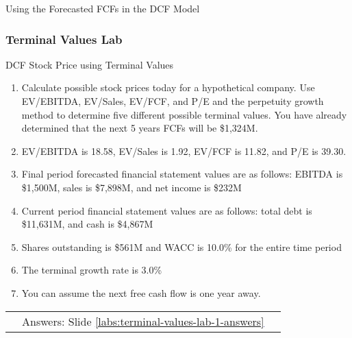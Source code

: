 \documentclass[handout, 11pt]{beamer}
\begin{document}
\begin{section}[Valuation]{Using the Forecasted FCFs in the DCF Model}
\begin{frame}
\end{frame}
\footnotesize
\begin{frame}
\frametitle{Terminal Values Lab}
{
\begin{block}{DCF Stock Price using Terminal Values}
\begin{enumerate}
\item Calculate possible stock prices today for a hypothetical company. Use EV/EBITDA, EV/Sales, EV/FCF, and P/E and the perpetuity growth method to determine five different possible terminal values. You have already determined that the next 5 years FCFs will be \$1,324M. 
\item EV/EBITDA is 18.58, EV/Sales is 1.92, EV/FCF is 11.82, and P/E is 39.30.
\item Final period forecasted financial statement values are as follows: EBITDA is \$1,500M, sales is \$7,898M, and net income is \$232M
\item Current period financial statement values are as follows: total debt is \$11,631M, and cash is \$4,867M
\item Shares outstanding is \$561M and WACC is 10.0\% for the entire time period
\item The terminal growth rate is 3.0\%
\item You can assume the next free cash flow is one year away.
\end{enumerate}
\vfill
\begin{tabular*}{\textwidth}{@{\extracolsep{\fill}}ccc}
\toprule
\hfill & Answers: Slide \textcolor{blue}{\underline{\ref{labs:terminal-values-lab-1-answers}}} & \hfill\\

\end{tabular*}
\end{block}
}
\label{labs:terminal-values-lab-1}
\end{frame}
\normalsize
\end{section}
\appendix
{}
\setcounter{finalframe}{\value{framenumber}}
\end{document}

